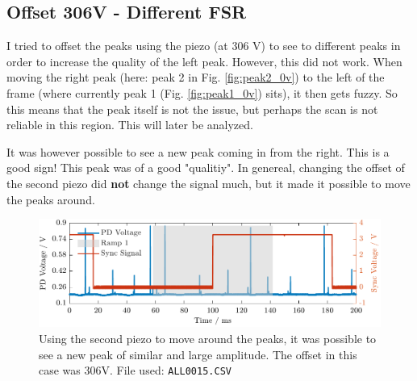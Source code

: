 \documentclass[a4paper,11pt]{article}
\begin{document}
\subsection{Offset 306V - Different FSR}
I tried to offset the peaks using the piezo (at 306 V) to see to different peaks in order to increase the quality of the left peak. 
However, this did not work.
When moving the right peak (here: peak 2 in Fig. \ref{fig:peak2_0v}) to the left of the frame (where currently peak 1 (Fig. \ref{fig:peak1_0v}) sits), it then gets fuzzy. 
So this means that the peak itself is not the issue, but perhaps the scan is not reliable in this region. This will later be analyzed.

It was however possible to see a new peak coming in from the right.
This is a good sign! 
This peak was of a good "qualitiy". In genereal, changing the offset of the second piezo did \textbf{not} change the signal much, but it made it possible to move the peaks around.


\begin{figure}[H]
    \centering
    \includegraphics[width=\textwidth]{twoPiezo/Figure_11.pdf}
    \caption{Using the second piezo to move around the peaks, it was possible to see a new peak of similar and large amplitude. The offset in this case was 306V. File used: \texttt{ALL0015.CSV}}
\end{figure}
\end{document}
